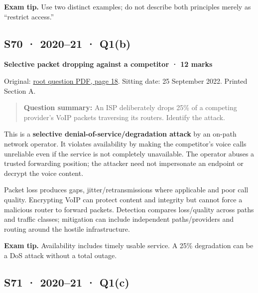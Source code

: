 \documentclass[11pt,a4paper]{article}
\begin{document}
{\color{ForestGreen}\textbf{Exam tip.} Use two distinct examples; do not describe both principles merely as “restrict access.”}




\clearpage
\subsection{S70 · 2020–21 · Q1(b)}\label{s70}

\textbf{Selective packet dropping against a competitor · 12 marks}


Original: \href{../../CSE405-Security_Merged.pdf\#page=18}{root question PDF,\allowbreak{} page 18}. Sitting date: 25 September 2022. Printed Section A.



\begin{quote}\small

\textbf{Question summary:} An ISP deliberately drops 25\% of a competing provider’s VoIP packets traversing its routers. Identify the attack.



\end{quote}

This is a \textbf{selective denial-of-service/\allowbreak{}degradation attack} by an on-path network operator. It violates availability by making the competitor's voice calls unreliable even if the service is not completely unavailable. The operator abuses a trusted forwarding position; the attacker need not impersonate an endpoint or decrypt the voice content.


Packet loss produces gaps,\allowbreak{} jitter/\allowbreak{}retransmissions where applicable and poor call quality. Encrypting VoIP can protect content and integrity but cannot force a malicious router to forward packets. Detection compares loss/\allowbreak{}quality across paths and traffic classes; mitigation can include independent paths/\allowbreak{}providers and routing around the hostile infrastructure.



{\color{ForestGreen}\textbf{Exam tip.} Availability includes timely usable service. A 25\% degradation can be a DoS attack without a total outage.}




\clearpage
\subsection{S71 · 2020–21 · Q1(c)}\label{s71}
\end{document}
